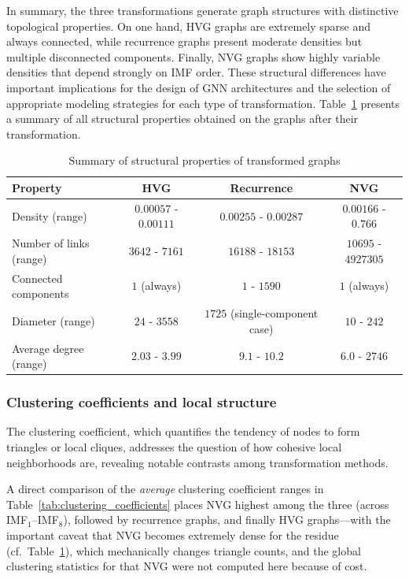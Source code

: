 \documentclass[11pt,a4paper]{article}
\begin{document}
In summary, the three transformations generate graph structures with distinctive topological properties. On one hand, HVG graphs are extremely sparse and always connected, while recurrence graphs present moderate densities but multiple disconnected components. Finally, NVG graphs show highly variable densities that depend strongly on IMF order. These structural differences have important implications for the design of GNN architectures and the selection of appropriate modeling strategies for each type of transformation. Table~\ref{tab:propiedades_estructurales} presents a summary of all structural properties obtained on the graphs after their transformation.

\begin{table}[h]
\centering
\caption{Summary of structural properties of transformed graphs}
\label{tab:propiedades_estructurales}
\small
\begin{tabular}{lccc}
\toprule
\textbf{Property} & \textbf{HVG} & \textbf{Recurrence} & \textbf{NVG} \\
\midrule
Density (range) & $0.00057$ - $0.00111$ & $0.00255$ - $0.00287$ & $0.00166$ - $0.766$ \\
Number of links (range) & $3642$ - $7161$ & $16188$ - $18153$ & $10695$ - $4927305$ \\
Connected components & $1$ (always) & $1$ - $1590$ & $1$ (always) \\
Diameter (range) & $24$ - $3558$ & $1725$ (single-component case) & $10$ - $242$ \\
Average degree (range) & $2.03$ - $3.99$ & $9.1$ - $10.2$ & $6.0$ - $2746$ \\
\bottomrule
\end{tabular}
\end{table}

\subsubsection{Clustering coefficients and local structure}

The clustering coefficient, which quantifies the tendency of nodes to form triangles or local cliques, addresses the question of how cohesive local neighborhoods are, revealing notable contrasts among transformation methods.

A direct comparison of the \emph{average} clustering coefficient ranges in Table~\ref{tab:clustering_coefficients} places NVG highest among the three (across IMF$_1$--IMF$_8$), followed by recurrence graphs, and finally HVG graphs---with the important caveat that NVG becomes extremely dense for the residue (cf.\ Table~\ref{tab:propiedades_estructurales}), which mechanically changes triangle counts, and the global clustering statistics for that NVG were not computed here because of cost.
\end{document}
